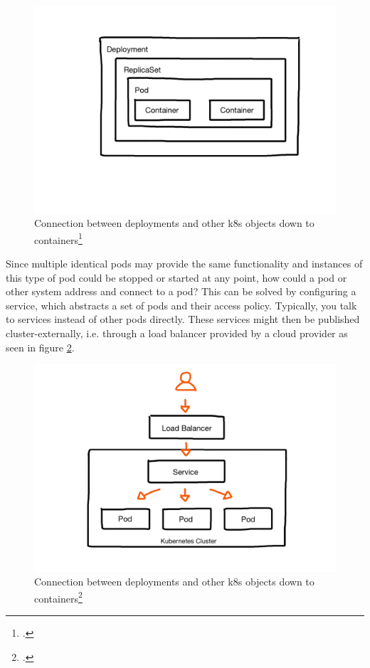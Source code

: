 \begin{figure}
\includegraphics[scale=0.2]{pictures/deployment.JPG} 
\caption{Connection between deployments and other \gls{k8s} objects down to containers\protect\footcite{nicoPictures}}
\label{fig:k8s-deployments}
\end{figure}

Since multiple identical pods may provide the same functionality and instances of this type of pod could be stopped or started at any point, how could a pod or other system address and connect to a pod? This can be solved by configuring a service, which abstracts a set of pods and their access policy. Typically, you talk to services instead of other pods directly. These services might then be published cluster-externally, i.e. through a load balancer provided by a cloud provider as seen in figure \ref{fig:loadbalancer}.

\begin{figure}
\includegraphics[scale=0.2]{pictures/loadbalancer.JPG} 
\caption{Connection between deployments and other \gls{k8s} objects down to containers\protect\footcite{nicoPictures}}
\label{fig:loadbalancer}
\end{figure}

